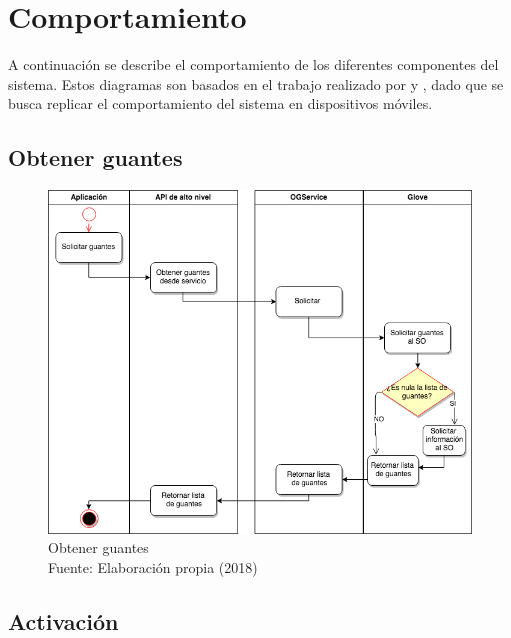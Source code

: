 \section{Comportamiento}
A continuación se describe el comportamiento de los diferentes componentes del sistema. Estos diagramas son basados en el trabajo realizado por \cite{tesis-meneses-sebastian} y \cite{tesis-cerda-rodrigo}, dado que se busca replicar el comportamiento del sistema en dispositivos móviles.

\subsection{Obtener guantes}

\begin{figure}[H]
  \begin{center} 
   	\includegraphics[width=1.0\textwidth]{images/chapter04/ActivityDiagrams-GetGloves.png} 
    \caption[Obtener guantes]{Obtener guantes \\Fuente: Elaboración propia (2018)}
    \label{fig:activity-diagrams01-GetGloves}
  \end{center}
\end{figure}

\subsection{Activación}

